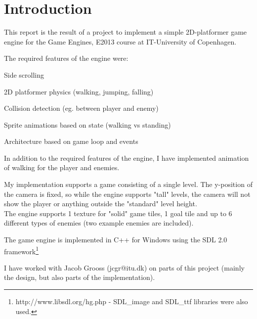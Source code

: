 \section{Introduction}
\label{Intro}
This report is the result of a project to implement a simple 2D-platformer game engine for the Game Engines, E2013 course at IT-University of Copenhagen.

The required features of the engine were:
\begin{my_itemize}
\item Side scrolling
\item 2D platformer physics (walking, jumping, falling)
\item Collision detection (eg. between player and enemy)
\item Sprite animations based on state (walking vs standing)
\item Architecture based on game loop and events
\end{my_itemize}

In addition to the required features of the engine, I have implemented animation of walking for the player and enemies.

My implementation supports a game consisting of a single level. The y-position of the camera is fixed, so while the engine supports "tall" levels, the camera will not show the player or anything outside the "standard" level height.
\\The engine supports 1 texture for "solid" game tiles, 1 goal tile and up to 6 different types of enemies (two example enemies are included).

The game engine is implemented in C++ for Windows using the SDL 2.0 framework\footnote{http://www.libsdl.org/hg.php - SDL\_image and SDL\_ttf libraries were also used.}

I have worked with Jacob Grooss (jcgr@itu.dk) on parts of this project (mainly the design, but also parts of the implementation).
